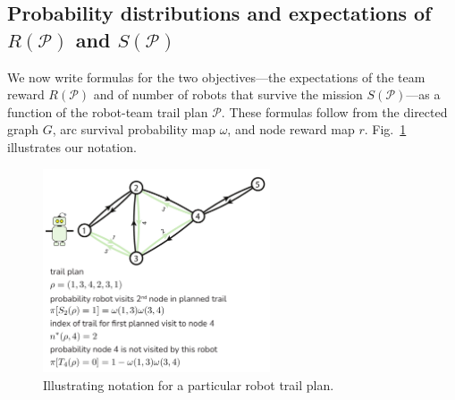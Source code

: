 \documentclass[11pt, oneside]{article}
\begin{document}
\subsection{Probability distributions and expectations of $R(\mathcal{P})$ and $S(\mathcal{P})$}
We now write formulas for the two objectives---the expectations of the team reward $R(\mathcal{P})$ and of number of robots that survive the mission $S(\mathcal{P})$---as a function of the robot-team trail plan $\mathcal{P}$. 
These formulas follow from the directed graph $G$, arc survival probability map $\omega$, and node reward map $r$. Fig.~\ref{fig:notation} illustrates our notation.

\begin{figure}[h!]
    \centering
    	\includegraphics[width=0.6\textwidth]{drawings/notation_fig/notation.pdf}
    \caption{Illustrating notation for a particular robot trail plan.} \label{fig:notation}
\end{figure}
\end{document}
